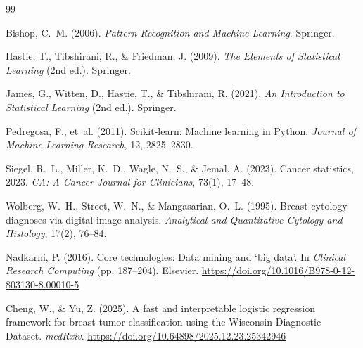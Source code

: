 \documentclass[twocolumn, fontsize=10pt]{article}
\begin{document}

\begin{thebibliography}{99}

Bishop, C.~M. (2006).
\newblock \textit{Pattern Recognition and Machine Learning}.
\newblock Springer.

Hastie, T., Tibshirani, R., \& Friedman, J. (2009).
\newblock \textit{The Elements of Statistical Learning} (2nd ed.).
\newblock Springer.

James, G., Witten, D., Hastie, T., \& Tibshirani, R. (2021).
\newblock \textit{An Introduction to Statistical Learning} (2nd ed.).
\newblock Springer.

Pedregosa, F., et~al. (2011).
\newblock Scikit-learn: Machine learning in Python.
\newblock \textit{Journal of Machine Learning Research}, 12, 2825--2830.

Siegel, R.~L., Miller, K.~D., Wagle, N.~S., \& Jemal, A. (2023).
\newblock Cancer statistics, 2023.
\newblock \textit{CA: A Cancer Journal for Clinicians}, 73(1), 17--48.

Wolberg, W.~H., Street, W.~N., \& Mangasarian, O.~L. (1995).
\newblock Breast cytology diagnoses via digital image analysis.
\newblock \textit{Analytical and Quantitative Cytology and Histology},
17(2), 76--84.

Nadkarni, P. (2016).
\newblock Core technologies: Data mining and `big data'.
\newblock In \textit{Clinical Research Computing} (pp. 187--204).
\newblock Elsevier.
\newblock \url{https://doi.org/10.1016/B978-0-12-803130-8.00010-5}

Cheng, W., \& Yu, Z. (2025).
\newblock A fast and interpretable logistic regression framework for breast tumor classification using the Wisconsin Diagnostic Dataset.
\newblock \textit{medRxiv}.
\newblock \url{https://doi.org/10.64898/2025.12.23.25342946}

\end{thebibliography}
\end{document}
